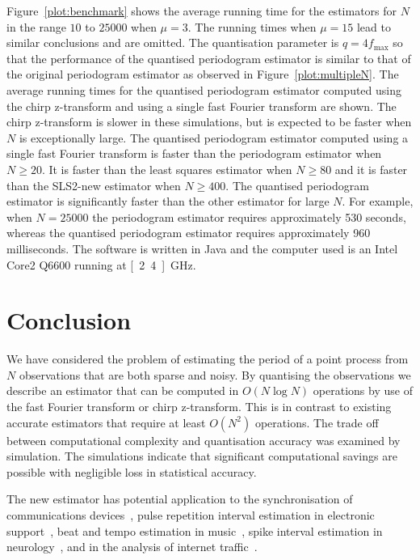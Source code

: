 \documentclass[10pt,twocolumn,twoside]{IEEEtran}
\begin{document}
Figure~\ref{plot:benchmark} shows the average running time for the estimators for $N$ in the range $10$ to $25000$ when $\mu=3$.  The running times when $\mu=15$ lead to similar conclusions and are omitted.  The quantisation parameter is $q = 4 f_{\text{max}}$ so that the performance of the quantised periodogram estimator is similar to that of the original periodogram estimator as observed in Figure~\ref{plot:multipleN}.  The average running times for the quantised periodogram estimator computed using the chirp z-transform and using a single fast Fourier transform are shown.  The chirp z-transform is slower in these simulations, but is expected to be faster when $N$ is exceptionally large.  The quantised periodogram estimator computed using a single fast Fourier transform is faster than the periodogram estimator when $N \geq 20$.  It is faster than the least squares estimator when $N \geq 80$ and it is faster than the SLS2-new estimator when $N \geq 400$.  The quantised periodogram estimator is significantly faster than the other estimator for large $N$.  For example, when $N = 25000$ the periodogram estimator requires approximately 530 seconds, whereas the quantised periodogram estimator requires approximately 960 milliseconds.  The software is written in Java and the computer used is an Intel Core2 Q6600 running at \unit[2.4]{GHz}. 

 

\section{Conclusion}

We have considered the problem of estimating the period of a point process from $N$ observations that are both sparse and noisy.  By quantising the observations we describe an estimator that can be computed in $O(N\log N)$ operations by use of the fast Fourier transform or chirp z-transform.  This is in contrast to existing accurate estimators that require at least $O(N^2)$ operations.  The trade off between computational complexity and quantisation accuracy was examined by simulation.  The simulations indicate that significant computational savings are possible with negligible loss in statistical accuracy.

The new estimator has potential application to the synchronisation of communications devices~\cite{Fogel1988,Fogel1989_bit_synch_zero_crossings}, pulse repetition interval estimation in electronic support~\cite{EltonGray_puilse_train_rader_1994,Gray_more_pri_1994,Clarkson_thesis,clarkson_estimate_period_pulse_train_1996,Hauochan_pri_2012}, beat and tempo estimation in music~\cite{dixon_beat_extraction_2001}, spike interval estimation in neurology~\cite{Arnett_neuro_pri_1976,Brillinger_spike_trains_1988,Rossoni200630}, and in the analysis of internet traffic~\cite{He_detecting_periodic_patterns_in_internet_2006,5585849,5947313}.


\small

\end{document}

